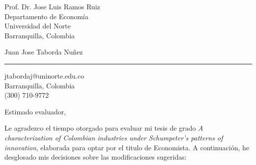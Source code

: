 \documentclass[11pt]{letter}
\begin{document}
\begin{letter}{ Prof. Dr. Jose Luis Ramos Ruiz \\
Departamento de Economía \\
Universidad del Norte \\
Barranquilla, Colombia} 

\begin{flushleft}
\large Juan Jose Taborda Nuñez \\ 
\vspace{20pt} \hrule height 1pt 
jtabordaj@uninorte.edu.co \\ Barranquilla, Colombia\\ (300) 710-9772
\end{flushleft} 
\vspace{30pt}

\signature{ \vspace{40pt} Juan Jose Taborda Nuñez \\ Estudiante de Economía} 


\opening{Estimado evaluador,} 

Le agradezco el tiempo otorgado para evaluar mi tesis de grado \textit{A characterization of Colombian industries under Schumpeter's patterns of innovation}, elaborada para optar por el titulo de Economista. A continuación, he desglosado mis decisiones sobre las modificaciones sugeridas:


\end{letter}
\end{document}
